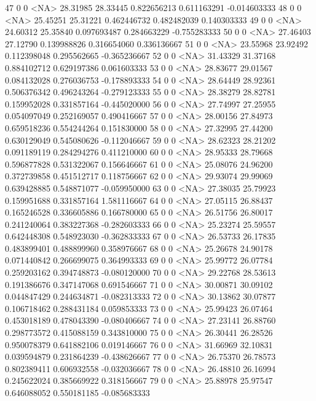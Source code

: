\documentclass{beamer}
\begin{document}
\begin{frame}[fragile]
\begin{itemize}
\begin{Schunk}
\begin{Soutput}
47       0       0 <NA> 28.31985 28.33445 0.822656213 0.611163291 -0.014603333
48       0       0 <NA> 25.45251 25.31221 0.462446732 0.482482039  0.140303333
49       0       0 <NA> 24.60312 25.35840 0.097693487 0.284663229 -0.755283333
50       0       0 <NA> 27.46403 27.12790 0.139988826 0.316654060  0.336136667
51       0       0 <NA> 23.55968 23.92492 0.112398048 0.295562665 -0.365236667
52       0       0 <NA> 31.43329 31.37168 0.884102712 0.629197386  0.061603333
53       0       0 <NA> 28.83677 29.01567 0.084132028 0.276036753 -0.178893333
54       0       0 <NA> 28.64449 28.92361 0.506376342 0.496243264 -0.279123333
55       0       0 <NA> 28.38279 28.82781 0.159952028 0.331857164 -0.445020000
56       0       0 <NA> 27.74997 27.25955 0.054097049 0.252169057  0.490416667
57       0       0 <NA> 28.00156 27.84973 0.659518236 0.554244264  0.151830000
58       0       0 <NA> 27.32995 27.44200 0.630129049 0.545080626 -0.112046667
59       0       0 <NA> 28.62323 28.21202 0.091189119 0.284294276  0.411210000
60       0       0 <NA> 28.95333 28.79668 0.596877828 0.531322067  0.156646667
61       0       0 <NA> 25.08076 24.96200 0.372739858 0.451512717  0.118756667
62       0       0 <NA> 29.93074 29.99069 0.639428885 0.548871077 -0.059950000
63       0       0 <NA> 27.38035 25.79923 0.159951688 0.331857164  1.581116667
64       0       0 <NA> 27.05115 26.88437 0.165246528 0.336605886  0.166780000
65       0       0 <NA> 26.51756 26.80017 0.241240064 0.383227368 -0.282603333
66       0       0 <NA> 25.23274 25.59557 0.642448308 0.548923030 -0.362833333
67       0       0 <NA> 26.53733 26.17835 0.483899401 0.488899960  0.358976667
68       0       0 <NA> 25.26678 24.90178 0.071440842 0.266699075  0.364993333
69       0       0 <NA> 25.99772 26.07784 0.259203162 0.394748873 -0.080120000
70       0       0 <NA> 29.22768 28.53613 0.191386676 0.347147068  0.691546667
71       0       0 <NA> 30.00871 30.09102 0.044847429 0.244634871 -0.082313333
72       0       0 <NA> 30.13862 30.07877 0.106718462 0.288431184  0.059853333
73       0       0 <NA> 25.99423 26.07464 0.453018189 0.478043390 -0.080406667
74       0       0 <NA> 27.23141 26.88760 0.298773572 0.415088159  0.343810000
75       0       0 <NA> 26.30441 26.28526 0.950078379 0.641882106  0.019146667
76       0       0 <NA> 31.66969 32.10831 0.039594879 0.231864239 -0.438626667
77       0       0 <NA> 26.75370 26.78573 0.802389411 0.606932558 -0.032036667
78       0       0 <NA> 26.48810 26.16994 0.245622024 0.385669922  0.318156667
79       0       0 <NA> 25.88978 25.97547 0.646088052 0.550181185 -0.085683333

\end{Soutput}
\end{Schunk}
\end{itemize}
\end{frame}
\end{document}

